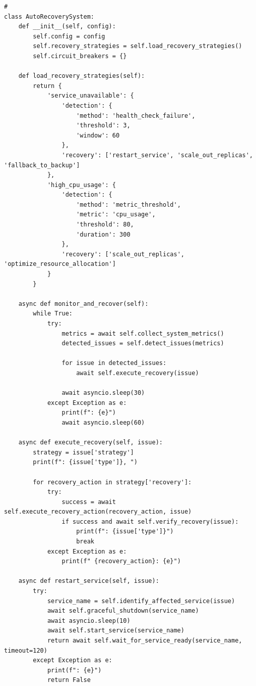 \begin{verbatim}
# 
class AutoRecoverySystem:
    def __init__(self, config):
        self.config = config
        self.recovery_strategies = self.load_recovery_strategies()
        self.circuit_breakers = {}
        
    def load_recovery_strategies(self):
        return {
            'service_unavailable': {
                'detection': {
                    'method': 'health_check_failure',
                    'threshold': 3,
                    'window': 60
                },
                'recovery': ['restart_service', 'scale_out_replicas', 'fallback_to_backup']
            },
            'high_cpu_usage': {
                'detection': {
                    'method': 'metric_threshold',
                    'metric': 'cpu_usage',
                    'threshold': 80,
                    'duration': 300
                },
                'recovery': ['scale_out_replicas', 'optimize_resource_allocation']
            }
        }
    
    async def monitor_and_recover(self):
        while True:
            try:
                metrics = await self.collect_system_metrics()
                detected_issues = self.detect_issues(metrics)
                
                for issue in detected_issues:
                    await self.execute_recovery(issue)
                    
                await asyncio.sleep(30)
            except Exception as e:
                print(f": {e}")
                await asyncio.sleep(60)
    
    async def execute_recovery(self, issue):
        strategy = issue['strategy']
        print(f": {issue['type']}, ")
        
        for recovery_action in strategy['recovery']:
            try:
                success = await self.execute_recovery_action(recovery_action, issue)
                if success and await self.verify_recovery(issue):
                    print(f": {issue['type']}")
                    break
            except Exception as e:
                print(f" {recovery_action}: {e}")
    
    async def restart_service(self, issue):
        try:
            service_name = self.identify_affected_service(issue)
            await self.graceful_shutdown(service_name)
            await asyncio.sleep(10)
            await self.start_service(service_name)
            return await self.wait_for_service_ready(service_name, timeout=120)
        except Exception as e:
            print(f": {e}")
            return False
\end{verbatim}

